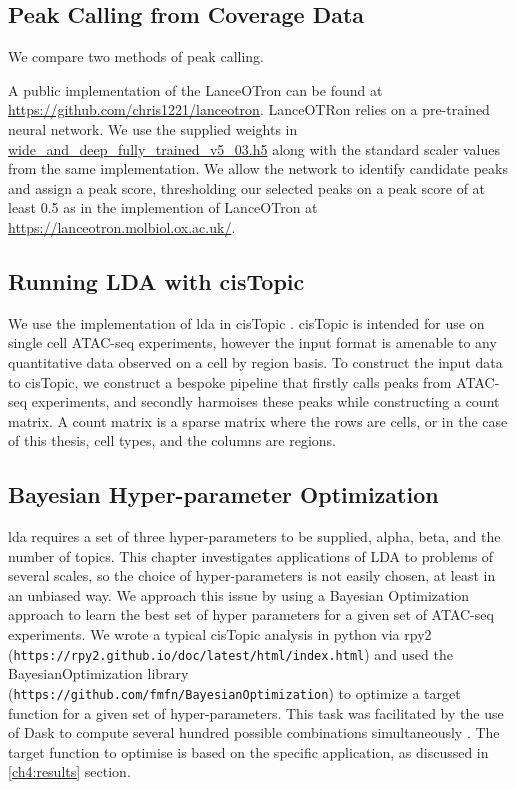 \subsection{Peak Calling from Coverage Data} \label{ch4:method_peaks}

We compare two methods of peak calling.

A public implementation of the LanceOTron can be found at \url{https://github.com/chris1221/lanceotron}. LanceOTRon relies on a pre-trained neural network. We use the supplied weights in \url{wide_and_deep_fully_trained_v5_03.h5} along with the standard scaler values from the same implementation. We allow the network to identify candidate peaks and assign a peak score, thresholding our selected peaks on a peak score of at least 0.5 as in the implemention of LanceOTron at \url{https://lanceotron.molbiol.ox.ac.uk/}.


\subsection{Running LDA with cisTopic} \label{ch4:method_cistopic}

We use the implementation of \gls{lda} in cisTopic \cite{BravoGonzalez-Blas2019}. cisTopic is intended for use on single cell ATAC-seq experiments, however the input format is amenable to any quantitative data observed on a cell by region basis. To construct the input data to cisTopic, we construct a bespoke pipeline that firstly calls peaks from ATAC-seq experiments, and secondly harmoises these peaks while constructing a count matrix. A count matrix is a sparse matrix where the rows are cells, or in the case of this thesis, cell types, and the columns are regions.



\subsection{Bayesian Hyper-parameter Optimization} \label{ch4:hyper}

\gls{lda} requires a set of three hyper-parameters to be supplied, alpha, beta, and the number of topics. This chapter investigates applications of LDA to problems of several scales, so the choice of hyper-parameters is not easily chosen, at least in an unbiased way. We approach this issue by using a Bayesian Optimization approach to learn the best set of hyper parameters for a given set of ATAC-seq experiments. We wrote a typical cisTopic analysis in python via rpy2 ({\tt https://rpy2.github.io/doc/latest/html/index.html}) and used the BayesianOptimization library ({\tt https://github.com/fmfn/BayesianOptimization}) to optimize a target function for a given set of hyper-parameters. This task was facilitated by the use of Dask to compute several hundred possible combinations simultaneously \cite{Rocklin2015}. The target function to optimise is based on the specific application, as discussed in \autoref{ch4:results} section.

